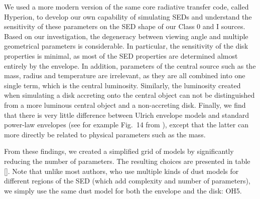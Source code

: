We used a more modern version of the same core radiative transfer code, called Hyperion, to develop our own capability of simulating SEDs and understand the sensitivity of these parameters on the SED shape of our Class 0 and I sources. Based on our investigation, the degeneracy between viewing angle and multiple geometrical parameters is considerable. In particular, the sensitivity of the disk properties is minimal, as most of the SED properties are determined almost entirely by the envelope. In addition, parameters of the central source such as the mass, radius and temperature are irrelevant, as they are all combined into one single term, which is the central luminosity. Similarly, the luminosity created when simulating a disk accreting onto the central object can not be distinguished from a more luminous central object and a non-accreting disk. Finally, we find that there is very little difference between Ulrich envelope models and standard power-law envelopes (see for example Fig.~14 from \citet{Whitney:2013cw}), except that the latter can more directly be related to physical parameters such as the mass. 

From these findings, we created a simplified grid of models by significantly reducing the number of parameters. The resulting choices are presented in table []. Note that unlike most authors, who use multiple kinds of dust models for different regions of the SED (which add complexity and number of parameters), we simply use the same dust model for both the envelope and the disk: OH5. 


